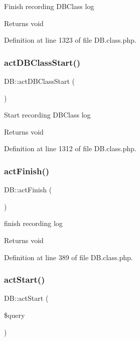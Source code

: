 Finish recording D\+B\+Class log \begin{DoxyReturn}{Returns}
void 
\end{DoxyReturn}


Definition at line 1323 of file D\+B.\+class.\+php.

\mbox{\label{classDB_a5aa10d0d5f40cbd7c9b20a84b1c1c307}} 
\subsubsection{\texorpdfstring{act\+D\+B\+Class\+Start()}{actDBClassStart()}}
{\footnotesize\ttfamily D\+B\+::act\+D\+B\+Class\+Start (\begin{DoxyParamCaption}{ }\end{DoxyParamCaption})}

Start recording D\+B\+Class log \begin{DoxyReturn}{Returns}
void 
\end{DoxyReturn}


Definition at line 1312 of file D\+B.\+class.\+php.

\mbox{\label{classDB_a79cad647912ef780e967819e6346a742}} 
\subsubsection{\texorpdfstring{act\+Finish()}{actFinish()}}
{\footnotesize\ttfamily D\+B\+::act\+Finish (\begin{DoxyParamCaption}{ }\end{DoxyParamCaption})}

finish recording log \begin{DoxyReturn}{Returns}
void 
\end{DoxyReturn}


Definition at line 389 of file D\+B.\+class.\+php.

\mbox{\label{classDB_a51a1ba94763a8211495eac18d74c80bb}} 
\subsubsection{\texorpdfstring{act\+Start()}{actStart()}}
{\footnotesize\ttfamily D\+B\+::act\+Start (\begin{DoxyParamCaption}\item[{}]{\$query }\end{DoxyParamCaption})}

